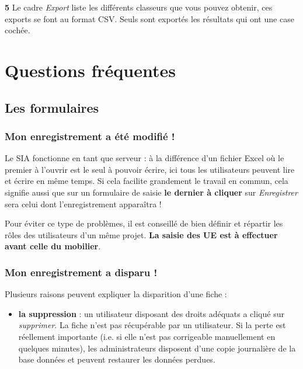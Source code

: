 \documentclass[letterpaper,10pt,french]{sphinxmanual}
\begin{document}
\textbf{5} Le cadre \emph{Export} liste les différents classeurs que vous pouvez obtenir, ces exports se font au format CSV. Seuls sont exportés les résultats qui ont une case cochée.


\chapter{Questions fréquentes}
\label{manuel/questions_frequentes:questions-frequentes}\label{manuel/questions_frequentes::doc}

\section{Les formulaires}
\label{manuel/questions_frequentes:les-formulaires}

\subsection{Mon enregistrement a été modifié !}
\label{manuel/questions_frequentes:mon-enregistrement-a-ete-modifie}
Le SIA fonctionne en tant que serveur : à la différence d'un fichier Excel où le premier à l'ouvrir est le seul à pouvoir écrire, ici tous les utilisateurs peuvent lire et écrire en même temps. Si cela facilite grandement le travail en commun, cela signifie aussi que sur un formulaire de saisie \textbf{le dernier à cliquer} sur \emph{Enregistrer} sera celui dont l'enregistrement apparaîtra !

Pour éviter ce type de problèmes, il est conseillé de bien définir et répartir les rôles des utilisateurs d'un même projet. \textbf{La saisie des UE est à effectuer avant celle du mobilier}.


\subsection{Mon enregistrement a disparu !}
\label{manuel/questions_frequentes:def-valeurs-perdues}\label{manuel/questions_frequentes:mon-enregistrement-a-disparu}
Plusieurs raisons peuvent expliquer la disparition d'une fiche :
\begin{itemize}
\item {} 
\textbf{la suppression} : un utilisateur disposant des droits adéquats a cliqué sur \emph{supprimer}. La fiche n'est pas récupérable par un utilisateur. Si la perte est réellement importante (i.e. si elle n'est pas corrigeable manuellement en quelques minutes), les administrateurs disposent d'une copie journalière de la base données et peuvent restaurer les données perdues.

\end{itemize}
\end{document}
